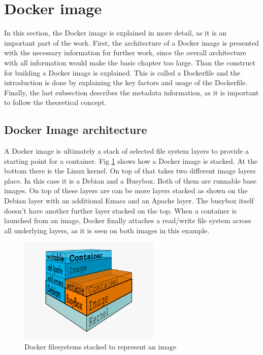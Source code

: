 \section{Docker image}
\label{sec:intro:docker_image:docker_img}
In this section, the Docker image is explained in more detail, as it is an important part of the work. First, the architecture of a Docker image is presented with the necessary information for further work, since the overall architecture with all information would make the basic chapter too large. Than the construct for building a Docker image is explained. This is called a Dockerfile and the introduction is done by explaining the key factors and usage of the Dockerfile.
Finally, the last subsection describes the metadata information, as it is important to follow the theoretical concept.

\subsection{Docker Image architecture}
\label{sec:intro:docker_image:docker_img:architecture}
A Docker image is ultimately a stack of selected file system layers to provide a starting point for a container.
Fig \ref{sec:intro:docker_image:docker_image_stack} shows how a Docker image is stacked. At the bottom there is the Linux kernel. On top of that takes two different image layers place. In this case it is a Debian and a Busybox.
Both of them are runnable base images.
On top of these layers are can be more layers stacked as shown on the Debian layer with an additional Emacs and an Apache layer. The busybox itself doesn't have another further layer stacked on the top.
When a container is launched from an image, Docker finally attaches a read/write file system across all underlying layers, as it is seen on both images in this example.

\begin{figure}[htbp]
 \centering
 \includegraphics[width=0.6\textwidth]{gfx/examples/docker-filesystems-busyboxrw}
 \caption{Docker filesystems stacked to represent an image}
\label{sec:intro:docker_image:docker_image_stack}
\end{figure}

